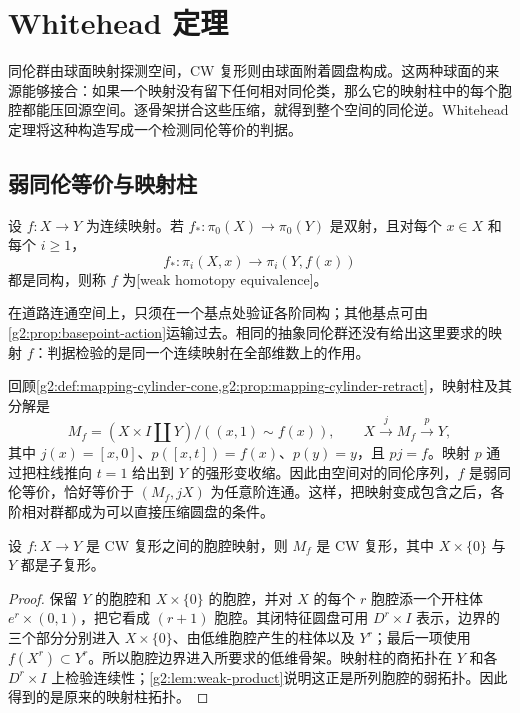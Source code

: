 
% 
% 

\section{Whitehead 定理}
\label{g2:sec:0903}

同伦群由球面映射探测空间，CW 复形则由球面附着圆盘构成。这两种球面的来源能够接合：如果一个映射没有留下任何相对同伦类，那么它的映射柱中的每个胞腔都能压回源空间。逐骨架拼合这些压缩，就得到整个空间的同伦逆。Whitehead 定理将这种构造写成一个检测同伦等价的判据。

\subsection{弱同伦等价与映射柱}
\label{g2:subsec:0903:01}

\begin{definition}[弱同伦等价]\label{g2:def:weak-homotopy-equivalence}
	设 \(f:X\rightarrow Y\) 为连续映射。若 \(f_*:\pi_0(X)\rightarrow\pi_0(Y)\) 是双射，且对每个 \(x\in X\) 和每个 \(i\ge1\)，
	\[
		f_*:\pi_i(X,x)\longrightarrow\pi_i(Y,f(x))
	\]
	都是同构，则称 \(f\) 为[weak homotopy equivalence]。
\end{definition}

在道路连通空间上，只须在一个基点处验证各阶同构；其他基点可由\cref{g2:prop:basepoint-action}运输过去。相同的抽象同伦群还没有给出这里要求的映射 \(f\)：判据检验的是同一个连续映射在全部维数上的作用。

\ProseParagraphBreak

回顾\cref{g2:def:mapping-cylinder-cone,g2:prop:mapping-cylinder-retract}，映射柱及其分解是
\[
	M_f=(X\times I\amalg Y)/((x,1)\sim f(x)),
	\qquad X\xrightarrow{j}M_f\xrightarrow{p}Y,
\]
其中 \(j(x)=[x,0]\)、\(p([x,t])=f(x)\)、\(p(y)=y\)，且 \(pj=f\)。映射 \(p\) 通过把柱线推向 \(t=1\) 给出到 \(Y\) 的强形变收缩。因此由空间对的同伦序列，\(f\) 是弱同伦等价，恰好等价于 \((M_f,jX)\) 为任意阶连通。这样，把映射变成包含之后，各阶相对群都成为可以直接压缩圆盘的条件。

\begin{lemma}\label{g2:lem:cellular-mapping-cylinder}
	设 \(f:X\rightarrow Y\) 是 CW 复形之间的胞腔映射，则 \(M_f\) 是 CW 复形，其中 \(X\times\{0\}\) 与 \(Y\) 都是子复形。
\end{lemma}
\begin{proof}
	保留 \(Y\) 的胞腔和 \(X\times\{0\}\) 的胞腔，并对 \(X\) 的每个 \(r\) 胞腔添一个开柱体 \(e^r\times(0,1)\)，把它看成 \((r+1)\) 胞腔。其闭特征圆盘可用 \(D^r\times I\) 表示，边界的三个部分分别进入 \(X\times\{0\}\)、由低维胞腔产生的柱体以及 \(Y^r\)；最后一项使用 \(f(X^r)\subset Y^r\)。所以胞腔边界进入所要求的低维骨架。映射柱的商拓扑在 \(Y\) 和各 \(D^r\times I\) 上检验连续性；\cref{g2:lem:weak-product}说明这正是所列胞腔的弱拓扑。因此得到的是原来的映射柱拓扑。
\end{proof}

